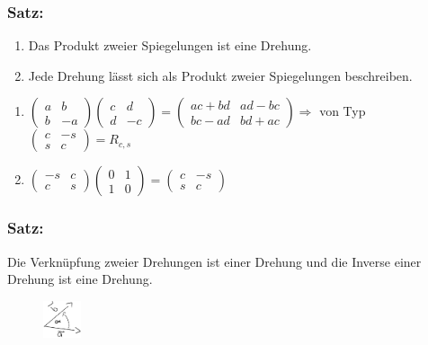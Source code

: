 \subsubsection{Satz:}
\begin{enumerate}
	\item Das Produkt zweier Spiegelungen ist eine Drehung.
	\item Jede Drehung lässt sich als Produkt zweier Spiegelungen beschreiben.
\end{enumerate}
\begin{enumerate}
	\item $ \begin{pmatrix} a & b \\ b & -a \end{pmatrix}  \begin{pmatrix} c & d \\ d & -c \end{pmatrix} = \begin{pmatrix} ac+bd & ad-bc \\ bc-ad & bd+ac \end{pmatrix} \Rightarrow$ von Typ $ \begin{pmatrix} c & -s \\ s & c \end{pmatrix} = R_{c,s}$
	\item $\begin{pmatrix} -s & c \\ c & s \end{pmatrix} \begin{pmatrix} 0 & 1 \\ 1 & 0 \end{pmatrix} = \begin{pmatrix} c  & -s \\ s & c \end{pmatrix}$
\end{enumerate}
%
%
%
\subsubsection{Satz:}
Die Verknüpfung zweier Drehungen ist einer Drehung und die Inverse einer Drehung ist eine Drehung. 
%
\begin{figure}[H]
\centering
\includegraphics[width=0.1\textwidth]{mainmatter/chapter1/pics/bewegung2.png}
\end{figure}
%

